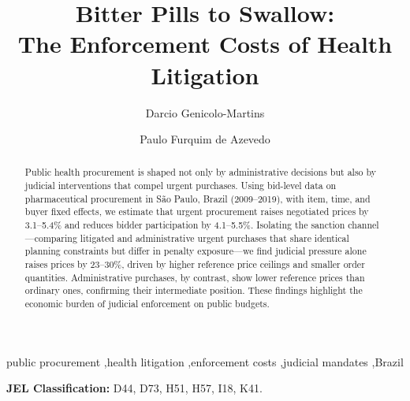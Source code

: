 \documentclass[12pt]{elsarticle}
\begin{document}
\begin{frontmatter}
\title{Bitter Pills to Swallow:\\ The Enforcement Costs of Health Litigation}

\author[INSPER]{Darcio Genicolo-Martins}
\author[INSPER]{Paulo Furquim de Azevedo}
\address[INSPER]{Insper Institute of Education and Research, S\~ao Paulo, Brazil}

\begin{abstract}
Public health procurement is shaped not only by administrative decisions but also by judicial interventions that compel urgent purchases. Using bid-level data on pharmaceutical procurement in S\~ao Paulo, Brazil (2009--2019), with item, time, and buyer fixed effects, we estimate that urgent procurement raises negotiated prices by 3.1--5.4\% and reduces bidder participation by 4.1--5.5\%. Isolating the sanction channel---comparing litigated and administrative urgent purchases that share identical planning constraints but differ in penalty exposure---we find judicial pressure alone raises prices by 23--30\%, driven by higher reference price ceilings and smaller order quantities. Administrative purchases, by contrast, show lower reference prices than ordinary ones, confirming their intermediate position. These findings highlight the economic burden of judicial enforcement on public budgets.
\end{abstract}

\begin{keyword}
public procurement \sep health litigation \sep enforcement costs \sep judicial mandates \sep Brazil
\end{keyword}

\end{frontmatter}

\noindent\textbf{JEL Classification:} D44, D73, H51, H57, I18, K41.

\bigskip
\clearpage
\begin{sloppypar}









\clearpage



\clearpage


\end{sloppypar}
\end{document}
